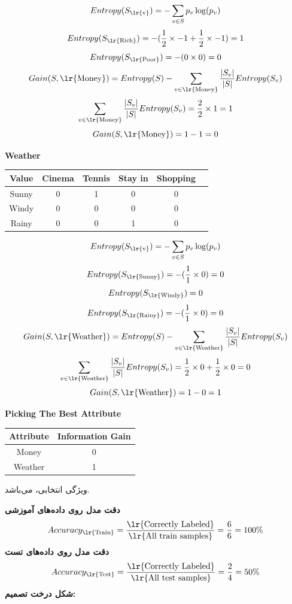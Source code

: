 \documentclass{article}
\newcommand{\tf}[1]{\text{\lr{#1}}}
\begin{document}
	\vspace{5pt}
	\[
	Entropy(S_{\text{\lr{v}}}) = -\sum_{v \in S} p_v\log (p_v)
	\]
	\[
	Entropy(S_{\tf{Rich}}) = -(\frac{1}{2} \times -1 + \frac{1}{2} \times -1) = 1
	\]
	\[
	Entropy(S_{\tf{Poor}}) = -(0 \times 0) = 0
	\]
	\vspace{10pt}
	\[
	Gain(S, \tf{Money}) = Entropy(S) - \sum_{v \in \tf{Money}} \frac{| S_v |}{| S |}Entropy(S_v)
	\] 
	\[
	\sum_{v \in \tf{Money}} \frac{| S_v |}{| S |}Entropy(S_v) = \frac{2}{2} \times 1= 1
	\]
	\[
	Gain(S, \tf{Money}) = 1 - 1 = 0
	\]
	\begin{latin}
		\textbf{Weather}
		\begin{center}
			\begin{tabular}{|c|c|c|c|c|c|}
				\hline
				Value & Cinema & Tennis & Stay in & Shopping\\
				\hline
				\hline
				Sunny & ‌0& 1 & 0 & 0\\
				\hline
				Windy & 0 & 0 & 0 & 0\\
				\hline
				Rainy & 0 & 0 & 1 & 0\\
				\hline
			\end{tabular}
		\end{center}
	\end{latin}
	\vspace{5pt}
	\[
	Entropy(S_{\tf{v}}) = -\sum_{v \in S} p_v\log (p_v)
	\]
	\[
	Entropy(S_{\tf{Sunny}}) = -(\frac{1}{1} \times 0) = 0
	\]
	\[
	Entropy(S_{\tf{Windy}}) = 0
	\]
	\[
	Entropy(S_{\tf{Rainy}}) = -(\frac{1}{1} \times 0) = 0
	\]
	\vspace{10pt}
	\[
	Gain(S, \tf{Weather}) = Entropy(S) - \sum_{v \in \tf{Weather}} \frac{| S_v |}{| S |}Entropy(S_v)
	\] 
	\[
	\sum_{v \in \tf{Weather}} \frac{| S_v |}{| S |}Entropy(S_v) = \frac{1}{2} \times 0 + \frac{1}{2} \times 0 = 0
	\]
	\[
	Gain(S, \tf{Weather}) = 1 - 0 = 1
	\]
	\begin{latin}
		\textbf{Picking The Best Attribute}
		\begin{center}
			\begin{tabular}{|c|c|}
				\hline
				Attribute & Information Gain\\
				\hline
				\hline
				Money & 0\\
				Weather & 1\\
				\hline
			\end{tabular}
		\end{center}
	\end{latin}
	ویژگی انتخابی،
	می‌باشد.
	
	\vspace{10pt}
	\textbf{دقت مدل روی داده‌های آموزشی}
	\[
	Accuracy_{\tf{Train}} = \frac{\tf{Correctly Labeled}}{\tf{All train samples}} = \frac{6}{6} = 100\%
	\]
	\vspace{10pt}
	\textbf{دقت مدل روی داده‌های تست}
	\[
	Accuracy_{\tf{Test}} = \frac{\tf{Correctly Labeled}}{\tf{All test samples}} = \frac{2}{4} = 50\%
	\]
	\textbf{شکل درخت تصمیم:}
	
\end{document}
